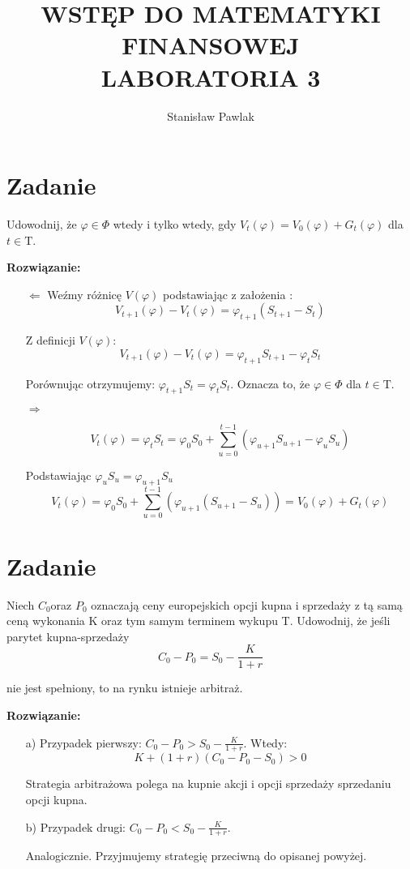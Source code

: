 \documentclass{article}
\title{WSTĘP DO MATEMATYKI FINANSOWEJ \\
LABORATORIA 3\\}
\author{Stanisław Pawlak}
\newcommand{\Tau}{\mathrm{T}}
\begin{document}
\maketitle
\section{Zadanie}
Udowodnij, że $\varphi \in \Phi$ wtedy i tylko wtedy, gdy $V_{t}(\varphi) = V_{0}(\varphi) +G_{t}(\varphi)$ dla $t \in \Tau$.
\newline


\textbf{Rozwiązanie:}
\begin{itemize}
\large
    \item [$\Leftarrow$]
    Weźmy różnicę $V(\varphi)$ podstawiając z założenia :
    $$V_{t+1}(\varphi) - V_{t}(\varphi) = \varphi_{t+1}(S_{t+1} - S_{t})$$
    
    Z definicji $V(\varphi)$:
    $$ V_{t+1}(\varphi) - V_{t}(\varphi) = \varphi_{t+1}S_{t+1} - \varphi_{t}S_{t} $$
    
    Porównując otrzymujemy: $\varphi_{t+1}S_{t} = \varphi_{t}S_{t}$. Oznacza to, że $\varphi \in \Phi$ dla $t \in \Tau$.
    

    \item [$\Rightarrow$]
    
   $$V_{t}(\varphi) =  \varphi_{t}S_{t} = \varphi_{0}S_{0} + \sum_{u=0}^{t-1} (\varphi_{u+1}S_{u+1} - \varphi_{u}S_{u})$$
    
    Podstawiając $\varphi_{u}S_{u} = \varphi_{u+1}S_{u}$
    $$V_{t}(\varphi) =   \varphi_{0}S_{0} + \sum_{u=0}^{t-1} (\varphi_{u+1}(S_{u+1} - S_{u})) =   V_{0}(\varphi) + G_{t}(\varphi)$$ 
\end{itemize}


\section{Zadanie}

Niech $C_{0}$oraz $P_{0}$ oznaczają ceny europejskich opcji kupna i sprzedaży z tą samą ceną wykonania K oraz tym samym terminem wykupu T. Udowodnij, że jeśli parytet kupna-sprzedaży
$$C_{0} - P_{0} = S_{0} - \frac{K}{1+ r}$$

nie jest spełniony, to na rynku istnieje arbitraż.

\textbf{Rozwiązanie:}
\begin{itemize}
    \item [a)] Przypadek pierwszy: $C_{0} - P_{0} > S_{0} - \frac{K}{1+ r}$. Wtedy: \\
    $$K + (1+r)(C_{0} - P_{0} - S_{0}) > 0$$
   
   Strategia arbitrażowa polega na kupnie akcji i opcji sprzedaży sprzedaniu opcji kupna.
   
   \item [b)] Przypadek drugi: $C_{0} - P_{0} < S_{0} - \frac{K}{1+ r}$. 
   
   Analogicznie. Przyjmujemy strategię przeciwną do opisanej powyżej.
\end{itemize}
\end{document}
